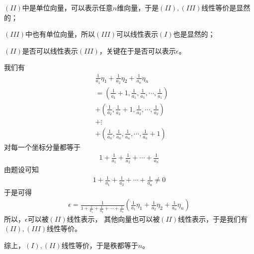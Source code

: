 \documentclass{article}
\begin{document}
$(II)$中是单位向量，可以表示任意$n$维向量，于是$(II), (III)$线性等价是显然的；

$(III)$中也有单位向量，所以$(III)$可以线性表示$(I)$也是显然的；

$(II)$是否可以线性表示$(III)$，关键在于是否可以表示$\epsilon$。

我们有
\begin{align*}
   & \frac{1}{a_1}\eta_1 + \frac{1}{a_2}\eta_2 + \frac{1}{a_n} \eta_n           \\
   & = (\frac{1}{a_1} + 1, \frac{1}{a_1}, \frac{1}{a_1}, \cdots, \frac{1}{a_1}) \\
   & + (\frac{1}{a_2}, \frac{1}{a_2} + 1, \frac{1}{a_2}, \cdots, \frac{1}{a_2}) \\
   & + \vdots                                                                   \\
   & + (\frac{1}{a_n}, \frac{1}{a_n}, \frac{1}{a_n}, \cdots, \frac{1}{a_n} + 1) 
\end{align*}
对每一个坐标分量都等于
\begin{align*}
  1 + \frac{1}{a_1} + \frac{1}{a_2} + \cdots + \frac{1}{a_n}
\end{align*}
由题设可知
\begin{align*}
  1 + \frac{1}{a_1} + \frac{1}{a_2} + \cdots + \frac{1}{a_n} \neq 0
\end{align*}
于是可得
\begin{align*}
  \epsilon = \frac{1}{1 + \frac{1}{a_1} + \frac{1}{a_2} + \cdots + \frac{1}{a_n}} (\frac{1}{a_1}\eta_1 + \frac{1}{a_2}\eta_2 + \frac{1}{a_n} \eta_n           )
\end{align*}
所以，$\epsilon$可以被$(II)$线性表示，
其他向量也可以被$(II)$线性表示，于是我们有$(II), (III)$线性等价。

综上，$(I),(II)$线性等价，于是秩都等于$n$。
\end{document}
